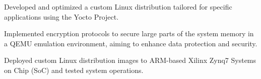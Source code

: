 \begin{tightemize}
    \item Developed and optimized a custom Linux distribution tailored for specific applications using the Yocto Project.

    \item Implemented encryption protocols to secure large parts of the system memory in a QEMU emulation environment, aiming to enhance data protection and security.
    
    \item Deployed custom Linux distribution images to ARM-based Xilinx Zynq7 Systems on Chip (SoC) and tested system operations.
\end{tightemize}